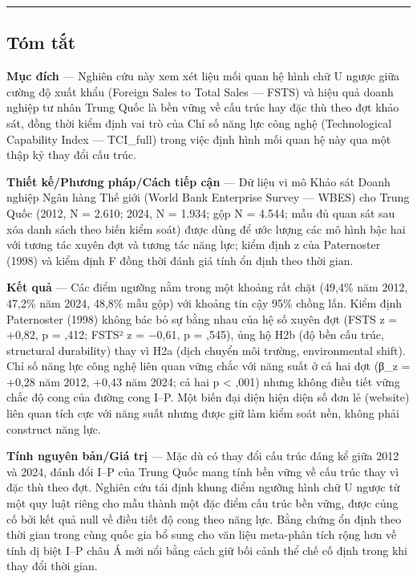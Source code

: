 \documentclass[12pt,a4paper]{article}
\begin{document}
\begin{center}\rule{0.5\linewidth}{0.5pt}\end{center}

\hypertarget{tuxf3m-tux1eaft}{%
\subsection{Tóm tắt}\label{tuxf3m-tux1eaft}}

\textbf{Mục đích} --- Nghiên cứu này xem xét liệu mối quan hệ hình chữ U
ngược giữa cường độ xuất khẩu (Foreign Sales to Total Sales --- FSTS) và
hiệu quả doanh nghiệp tư nhân Trung Quốc là bền vững về cấu trúc hay đặc
thù theo đợt khảo sát, đồng thời kiểm định vai trò của Chỉ số năng lực
công nghệ (Technological Capability Index --- TCI\_full) trong việc định
hình mối quan hệ này qua một thập kỷ thay đổi cấu trúc.

\textbf{Thiết kế/Phương pháp/Cách tiếp cận} --- Dữ liệu vi mô Khảo sát
Doanh nghiệp Ngân hàng Thế giới (World Bank Enterprise Survey --- WBES)
cho Trung Quốc (2012, N = 2.610; 2024, N = 1.934; gộp N = 4.544; mẫu đủ
quan sát sau xóa danh sách theo biến kiểm soát) được dùng để ước lượng
các mô hình bậc hai với tương tác xuyên đợt và tương tác năng lực; kiểm
định z của Paternoster (1998) và kiểm định F đồng thời đánh giá tính ổn
định theo thời gian.

\textbf{Kết quả} --- Các điểm ngưỡng nằm trong một khoảng rất chặt
(49,4\% năm 2012, 47,2\% năm 2024, 48,8\% mẫu gộp) với khoảng tin cậy
95\% chồng lấn. Kiểm định Paternoster (1998) không bác bỏ sự bằng nhau
của hệ số xuyên đợt (FSTS z = +0,82, p = ,412; FSTS² z = −0,61, p =
,545), ủng hộ H2b (độ bền cấu trúc, structural durability) thay vì H2a
(dịch chuyển môi trường, environmental shift). Chỉ số năng lực công nghệ
liên quan vững chắc với năng suất ở cả hai đợt (β\_z = +0,28 năm 2012,
+0,43 năm 2024; cả hai p \textless{} ,001) nhưng không điều tiết vững
chắc độ cong của đường cong I--P. Một biến đại diện hiện diện số đơn lẻ
(website) liên quan tích cực với năng suất nhưng được giữ làm kiểm soát
nền, không phải construct năng lực.

\textbf{Tính nguyên bản/Giá trị} --- Mặc dù có thay đổi cấu trúc đáng kể
giữa 2012 và 2024, đánh đổi I--P của Trung Quốc mang tính bền vững về
cấu trúc thay vì đặc thù theo đợt. Nghiên cứu tái định khung điểm ngưỡng
hình chữ U ngược từ một quy luật riêng cho mẫu thành một đặc điểm cấu
trúc bền vững, được củng cố bởi kết quả null về điều tiết độ cong theo
năng lực. Bằng chứng ổn định theo thời gian trong cùng quốc gia bổ sung
cho văn liệu meta-phân tích rộng hơn về tính dị biệt I--P châu Á mới nổi
bằng cách giữ bối cảnh thể chế cố định trong khi thay đổi thời gian.
\end{document}
